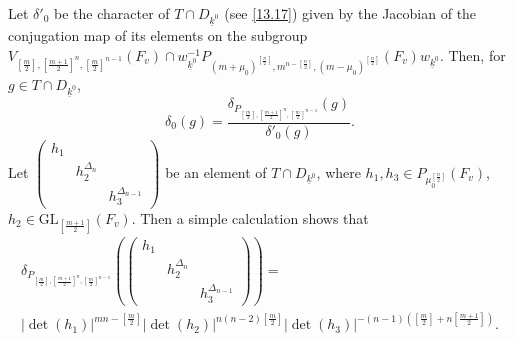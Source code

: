 \documentclass[12pts]{amsart}
\newcommand{\GL}{{\mathrm{GL}}}
\begin{document}
Let $\delta'_0$ be the character of $T\cap D_{\underline{k}^0}$ (see \eqref{13.17}) given by the Jacobian of the conjugation map of its elements on the subgroup\\
$V_{[\frac{m}{2}],[\frac{m+1}{2}]^n,[\frac{m}{2}]^{n-1}}(F_v)\cap w^{-1}_{\underline{k}^0}P_{(m+\mu_0)^{[\frac{n}{2}]},m^{n-[\frac{n}{2}]}, (m-\mu_0)^{[\frac{n}{2}]}}(F_v)w_{\underline{k}^0}$. Then, for\\
 $g\in T\cap D_{\underline{k}^0}$,
\begin{equation}\label{13.31}
\delta_0(g)=\frac{\delta_{P_{[\frac{m}{2}],[\frac{m+1}{2}]^n,[\frac{m}{2}]^{n-1}}}(g)}{\delta'_0(g)}.
\end{equation}
Let $\begin{pmatrix}h_1\\&h_2^{\Delta_n}\\&&h_3^{\Delta_{n-1}}\end{pmatrix}$ be an element of $T\cap D_{\underline{k}^0}$, where $h_1,h_3\in P_{\mu_0^{[\frac{n}{2}]}}(F_v)$,\\
 $h_2\in \GL_{[\frac{m+1}{2}]}(F_v)$. Then a simple calculation shows that
\begin{multline}\label{13.32}
 \delta_{P_{[\frac{m}{2}],[\frac{m+1}{2}]^n,[\frac{m}{2}]^{n-1}}}(\begin{pmatrix}h_1\\&h_2^{\Delta_n}\\&&h_3^{\Delta_{n-1}}\end{pmatrix})=\\
 |\det(h_1)|^{mn-[\frac{m}{2}]}|\det(h_2)|^{n(n-2)[\frac{m}{2}]}|\det(h_3)|^{-(n-1)([\frac{m}{2}]+n[\frac{m+1}{2}])}.
 \end{multline}
\end{document}
